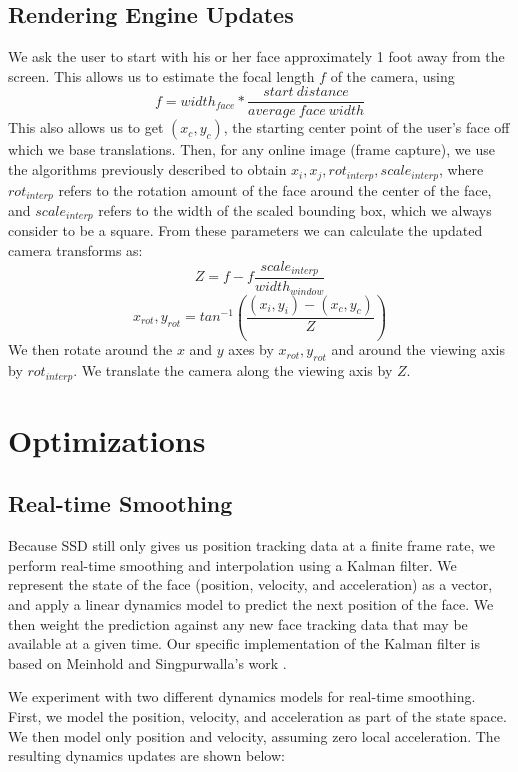 \documentclass[10pt,twocolumn,letterpaper]{article}
\begin{document}
\subsection*{Rendering Engine Updates}
We ask the user to start with his or her face approximately 1 foot away from the screen. This allows us to estimate the focal length $f$ of the camera, using
$$f = width_{face} * \frac{start\ distance}{average\ face\ width}$$
This also allows us to get $(x_c, y_c)$, the starting center point of the user's face off which we base translations.
Then, for any online image (frame capture), we use the algorithms previously described to obtain $x_i, x_j, rot_{interp}, scale_{interp}$, where $rot_{interp}$ refers to the rotation amount of the face around the center of the face, and $scale_{interp}$ refers to the width of the scaled bounding box, which we always consider to be a square. From these parameters we can calculate the updated camera transforms as:
$$Z = f - f \frac{scale_{interp}}{width_{window}}$$
$$x_{rot}, y_{rot} = tan^{-1}(\frac{(x_i,y_i)-(x_c,y_c)}{Z})$$
We then rotate around the $x$ and $y$ axes by $x_{rot}, y_{rot}$ and around the viewing axis by $rot_{interp}$. We translate the camera along the viewing axis by $Z$.

\section*{Optimizations}
\subsection*{Real-time Smoothing}
Because SSD still only gives us position tracking data at a finite frame rate, we perform real-time smoothing and interpolation using a Kalman filter. We represent the state of the face (position, velocity, and acceleration) as a vector, and apply a linear dynamics model to predict the next position of the face. We then weight the prediction against any new face tracking data that may be available at a given time. Our specific implementation of the Kalman filter is based on Meinhold and Singpurwalla's work \cite{kalman}.

We experiment with two different dynamics models for real-time smoothing. First, we model the position, velocity, and acceleration as part of the state space. We then model only position and velocity, assuming zero local acceleration. The resulting dynamics updates are shown below:
\end{document}

